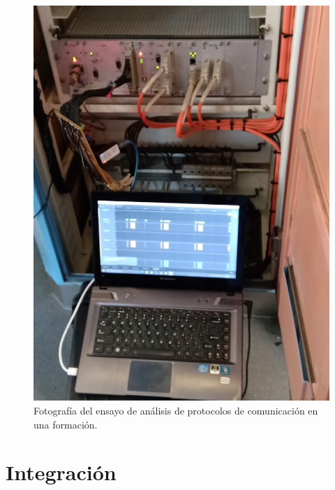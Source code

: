 \documentclass[
11pt, %
]{charter}
\begin{document}
\begin{figure}[htpb]
\centering 
\includegraphics[width=1\textwidth]{./Pics/IMG_20210414_104653.jpg}
\caption{Fotografía del ensayo de análisis de protocolos de comunicación en una formación.}
\label{fig:sniffingPhoto}
\end{figure}

\section{Integración}
\end{document}
